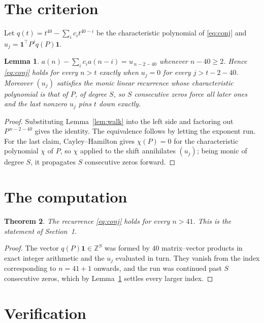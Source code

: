 \documentclass[11pt,a4paper]{article}
\theoremstyle{plain}
\newtheorem{theorem}{Theorem}
\newtheorem{lemma}[theorem]{Lemma}
\theoremstyle{definition}
\begin{document}
\section{The criterion}

Let $q(t)=t^{40}-\sum_i c_i t^{40-i}$ be the characteristic polynomial of
\eqref{eq:conj} and $u_j=\mathbf{1}^{\!\top}P^{j}q(P)\mathbf{1}$.

\begin{lemma}\label{lem:crit}
$a(n)-\sum_i c_i a(n-i)=u_{\,n-2-40}$ whenever $n-40\ge2$. Hence
\eqref{eq:conj} holds for every $n>t$ exactly when $u_j=0$ for every
$j>t-2-40$. Moreover $(u_j)$ satisfies the monic linear recurrence whose
characteristic polynomial is that of $P$, of degree $S$, so $S$ consecutive zeros force all
later ones and the last nonzero $u_j$ pins $t$ down exactly.
\end{lemma}

\begin{proof}
Substituting Lemma~\ref{lem:walk} into the left side and factoring out
$P^{\,n-2-40}$ gives the identity. The equivalence follows by letting the exponent
run. For the last claim, Cayley--Hamilton gives $\chi(P)=0$ for the characteristic
polynomial $\chi$ of $P$, so $\chi$ applied to the shift annihilates $(u_j)$; being monic of
degree $S$, it propagates $S$ consecutive zeros forward.
\end{proof}

\section{The computation}

\begin{theorem}
The recurrence \eqref{eq:conj} holds for every $n>41$. This is the statement of
Section~1.
\end{theorem}

\begin{proof}
The vector $q(P)\mathbf{1}\in\mathbb{Z}^{S}$ was formed by $40$ matrix--vector
products in exact integer arithmetic and the $u_j$ evaluated in turn. They vanish from the
index corresponding to $n=41+1$ onwards, and the run was continued past $S$ consecutive
zeros, which by Lemma~\ref{lem:crit} settles every larger index.
\end{proof}

\section{Verification}
\end{document}
